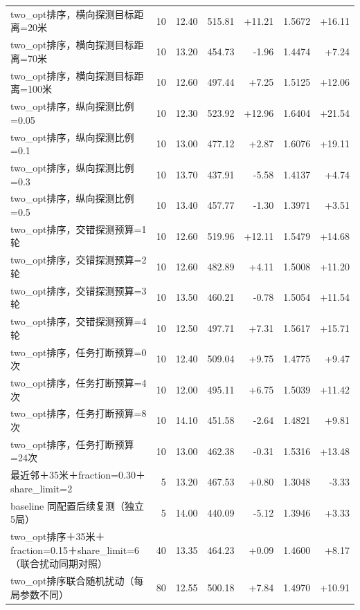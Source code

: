 \begin{longtable}{p{}rrrrrr}
two\_opt排序，横向探测目标距离=20米 & 10 & 12.40 & 515.81 & +11.21 & 1.5672 & +16.11 \\
two\_opt排序，横向探测目标距离=70米 & 10 & 13.20 & 454.73 & -1.96 & 1.4474 & +7.24 \\
two\_opt排序，横向探测目标距离=100米 & 10 & 12.60 & 497.44 & +7.25 & 1.5125 & +12.06 \\
two\_opt排序，纵向探测比例=0.05 & 10 & 12.30 & 523.92 & +12.96 & 1.6404 & +21.54 \\
two\_opt排序，纵向探测比例=0.1 & 10 & 13.00 & 477.12 & +2.87 & 1.6076 & +19.11 \\
two\_opt排序，纵向探测比例=0.3 & 10 & 13.70 & 437.91 & -5.58 & 1.4137 & +4.74 \\
two\_opt排序，纵向探测比例=0.5 & 10 & 13.40 & 457.77 & -1.30 & 1.3971 & +3.51 \\
two\_opt排序，交错探测预算=1轮 & 10 & 12.60 & 519.96 & +12.11 & 1.5479 & +14.68 \\
two\_opt排序，交错探测预算=2轮 & 10 & 12.60 & 482.89 & +4.11 & 1.5008 & +11.20 \\
two\_opt排序，交错探测预算=3轮 & 10 & 13.50 & 460.21 & -0.78 & 1.5054 & +11.54 \\
two\_opt排序，交错探测预算=4轮 & 10 & 12.50 & 497.71 & +7.31 & 1.5617 & +15.71 \\
two\_opt排序，任务打断预算=0次 & 10 & 12.40 & 509.04 & +9.75 & 1.4775 & +9.47 \\
two\_opt排序，任务打断预算=4次 & 10 & 12.00 & 495.11 & +6.75 & 1.5039 & +11.42 \\
two\_opt排序，任务打断预算=8次 & 10 & 14.10 & 451.58 & -2.64 & 1.4821 & +9.81 \\
two\_opt排序，任务打断预算=24次 & 10 & 13.00 & 462.38 & -0.31 & 1.5316 & +13.48 \\
最近邻＋35米＋fraction=0.30＋share\_limit=2 & 5 & 13.20 & 467.53 & +0.80 & 1.3048 & -3.33 \\
baseline 同配置后续复测（独立5局） & 5 & 14.00 & 440.09 & -5.12 & 1.3946 & +3.33 \\
two\_opt排序＋35米＋fraction=0.15＋share\_limit=6（联合扰动同期对照） & 40 & 13.35 & 464.23 & +0.09 & 1.4600 & +8.17 \\
two\_opt排序联合随机扰动（每局参数不同） & 80 & 12.55 & 500.18 & +7.84 & 1.4970 & +10.91 \\
\end{longtable}\endgroup
